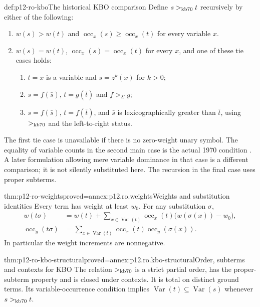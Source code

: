\begin{hbdefinition}{def:p12-ro-kbo}{The historical KBO comparison}
Define \(s>_{\rm kb70}t\) recursively by either of the following:
\begin{enumerate}
\item \(w(s)>w(t)\) and
      \(\operatorname{occ}_x(s)\geq\operatorname{occ}_x(t)\)
      for every variable \(x\).
\item \(w(s)=w(t)\),
      \(\operatorname{occ}_x(s)=\operatorname{occ}_x(t)\) for every
      \(x\), and one of these tie cases holds:
      \begin{enumerate}
      \item \(t=x\) is a variable and \(s=z^k(x)\) for \(k>0\);
      \item \(s=f(\bar s)\), \(t=g(\bar t)\) and \(f>_\Sigma g\);
      \item \(s=f(\bar s)\), \(t=f(\bar t)\), and \(\bar s\)
            is lexicographically greater than \(\bar t\), using
            \(>_{\rm kb70}\) and the left-to-right status.
      \end{enumerate}
\end{enumerate}
The first tie case is unavailable if there is no zero-weight unary symbol.
The equality of variable counts in the second main case is the actual
1970 condition \cite[pp.~267--268]{KnuthBendix1970}. A later formulation
allowing mere variable dominance in that case is a different comparison;
it is not silently substituted here. The recursion in the final case
uses proper subterms.
\end{hbdefinition}

\begin{hblemma}{thm:p12-ro-weights}{proved=annex:p12.ro.weights}{Weights and substitution identities}
Every term has weight at least \(w_0\). For any substitution \(\sigma\),
\[
\begin{aligned}
 w(t\sigma)&=w(t)+\sum_{x\in\operatorname{Var}(t)}
     \operatorname{occ}_x(t)\bigl(w(\sigma(x))-w_0\bigr),\\
 \operatorname{occ}_y(t\sigma)&=
     \sum_{x\in\operatorname{Var}(t)}
     \operatorname{occ}_x(t)\operatorname{occ}_y(\sigma(x)).
\end{aligned}
\]
In particular the weight increments are nonnegative.
\end{hblemma}

\begin{hblemma}{thm:p12-ro-kbo-structural}{proved=annex:p12.ro.kbo-structural}{Order, subterms and contexts for KBO}
The relation \(>_{\rm kb70}\) is a strict partial order, has the
proper-subterm property and is closed under contexts. It is total on
distinct ground terms. Its variable-occurrence condition implies
\(\operatorname{Var}(t)\subseteq\operatorname{Var}(s)\) whenever
\(s>_{\rm kb70}t\).
\end{hblemma}


